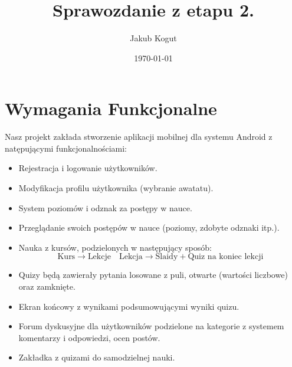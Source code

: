 \documentclass[11pt,a4paper]{article}
\title{Sprawozdanie z etapu 2.}
\author{Jakub Kogut}
\date{\today}
\numberwithin{equation}{section}
\begin{document}
\maketitle
\section{Wymagania Funkcjonalne}
Nasz projekt zakłada stworzenie aplikacji mobilnej dla systemu Android z natępującymi funkcjonalnościami:
\begin{itemize}
    \item Rejestracja i logowanie użytkowników.
    \item Modyfikacja profilu użytkownika (wybranie awatatu).
    \item System poziomów i odznak za postępy w nauce.
    \item Przeglądanie swoich postępów w nauce (poziomy, zdobyte odznaki itp.).
    \item Nauka z kursów, podzielonych w następujący sposób:
        \[
        \text{Kurs} \rightarrow \text{Lekcje}\quad \text{Lekcja} \rightarrow \text{Slaidy} + \text{Quiz na koniec lekcji}
        \]
    \item Quizy będą zawierały pytania losowane z puli, otwarte (wartości liczbowe) oraz zamknięte.
    \item Ekran końcowy z wynikami podsumowującymi wyniki quizu.
    \item Forum dyskusyjne dla użytkowników podzielone na kategorie z systemem komentarzy i odpowiedzi, ocen postów.
    \item Zakładka z quizami do samodzielnej nauki.
\end{itemize}
\end{document}
